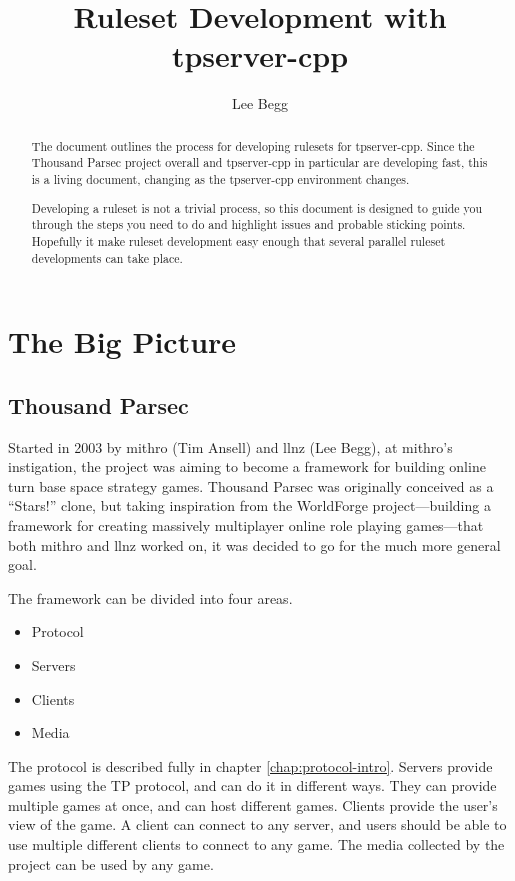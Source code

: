 \documentclass[a4paper,11pt]{report}
\title{Ruleset Development with tpserver-cpp}
\author{Lee Begg}
\begin{document}

\maketitle

\tableofcontents

\begin{abstract}
The document outlines the process for developing rulesets for tpserver-cpp. Since the Thousand Parsec project overall and tpserver-cpp in particular are developing fast, this is a living document, changing as the tpserver-cpp environment changes.

Developing a ruleset is not a trivial process, so this document is designed to guide you through the steps
you need to do and highlight issues and probable sticking points. Hopefully it make ruleset development easy enough that several parallel ruleset developments can take place.
\end{abstract}

\part{The Big Picture}
\label{part:intro}

\chapter{Thousand Parsec}
\label{chap:tp}
Started in 2003 by mithro (Tim Ansell) and llnz (Lee Begg), at mithro's instigation, the project was aiming to become a framework for building online turn base space strategy games. Thousand Parsec was originally conceived as a ``Stars!'' clone, but taking inspiration from the WorldForge project---building a framework for creating massively multiplayer online role playing games---that both mithro and llnz worked on, it was decided to go for the much more general goal.


The framework can be divided into four areas.
\begin{itemize}
 \item Protocol
 \item Servers
 \item Clients
 \item Media
\end{itemize}

The protocol is described fully in chapter \ref{chap:protocol-intro}. Servers provide games using the TP protocol, and can do it in different ways. They can provide multiple games at once, and can host different games. Clients provide the user's view of the game. A client can connect to any server, and users should be able to use multiple different clients to connect to any game. The media collected by the project can be used by any game.
\end{document}
